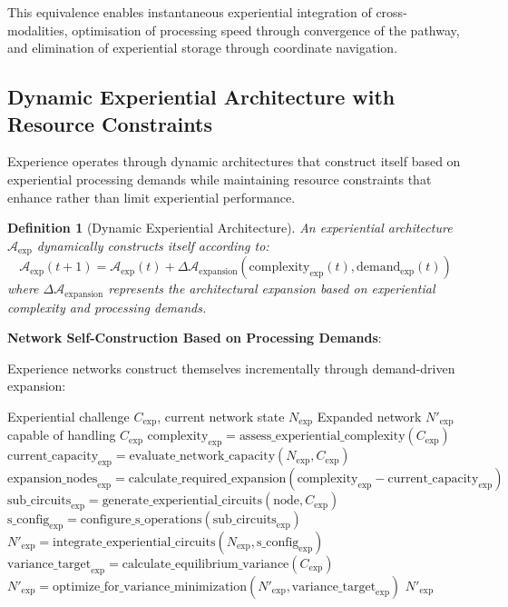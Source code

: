 \documentclass{article}
\newtheorem{definition}[theorem]{Definition}
\begin{document}
This equivalence enables instantaneous experiential integration of cross-modalities, optimisation of processing speed through convergence of the pathway, and elimination of experiential storage through coordinate navigation.

\subsection{Dynamic Experiential Architecture with Resource Constraints}

Experience operates through dynamic architectures that construct itself based on experiential processing demands while maintaining resource constraints that enhance rather than limit experiential performance.

\begin{definition}[Dynamic Experiential Architecture]
An experiential architecture $\mathcal{A}_{\text{exp}}$ dynamically constructs itself according to:
\begin{equation}
\mathcal{A}_{\text{exp}}(t+1) = \mathcal{A}_{\text{exp}}(t) + \Delta\mathcal{A}_{\text{expansion}}(\text{complexity}_{\text{exp}}(t), \text{demand}_{\text{exp}}(t))
\end{equation}
where $\Delta\mathcal{A}_{\text{expansion}}$ represents the architectural expansion based on experiential complexity and processing demands.
\end{definition}

\textbf{Network Self-Construction Based on Processing Demands}:

Experience networks construct themselves incrementally through demand-driven expansion:

\begin{algorithm}[H]
\caption{Dynamic Experience Network Construction}
\begin{algorithmic}[1]
\REQUIRE Experiential challenge $C_{\text{exp}}$, current network state $N_{\text{exp}}$
\ENSURE Expanded network $N'_{\text{exp}}$ capable of handling $C_{\text{exp}}$
\STATE $\text{complexity}_{\text{exp}} = \text{assess\_experiential\_complexity}(C_{\text{exp}})$
\STATE $\text{current\_capacity}_{\text{exp}} = \text{evaluate\_network\_capacity}(N_{\text{exp}}, C_{\text{exp}})$
    \STATE $\text{expansion\_nodes}_{\text{exp}} = \text{calculate\_required\_expansion}(\text{complexity}_{\text{exp}} - \text{current\_capacity}_{\text{exp}})$
        \STATE $\text{sub\_circuits}_{\text{exp}} = \text{generate\_experiential\_circuits}(\text{node}, C_{\text{exp}})$
        \STATE $\text{s\_config}_{\text{exp}} = \text{configure\_s\_operations}(\text{sub\_circuits}_{\text{exp}})$
        \STATE $N'_{\text{exp}} = \text{integrate\_experiential\_circuits}(N_{\text{exp}}, \text{s\_config}_{\text{exp}})$
    \ENDFOR
\ENDIF
\STATE $\text{variance\_target}_{\text{exp}} = \text{calculate\_equilibrium\_variance}(C_{\text{exp}})$
\STATE $N'_{\text{exp}} = \text{optimize\_for\_variance\_minimization}(N'_{\text{exp}}, \text{variance\_target}_{\text{exp}})$
\RETURN $N'_{\text{exp}}$
\end{algorithmic}
\end{algorithm}
\end{document}
